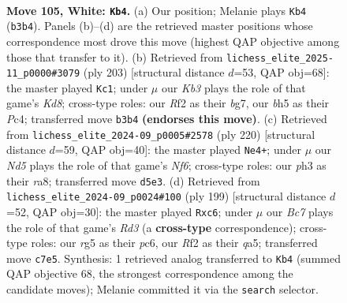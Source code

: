 \documentclass[11pt]{article}
\begin{document}
\clearpage

\begin{figure}[p]\centering
\begin{subfigure}{0.46\textwidth}\centering
\resizebox{\linewidth}{!}{%
\newchessgame
\chessboard[
  setfen={8/2B5/PPk5/3N1Brb/8/1K5p/5R2/8 w - - 9 105},
  showmover=false,
  pgfstyle=straightmove, color=movearrow, markmove={b3-b4}
]}
\caption{}
\end{subfigure}\hfill
\begin{subfigure}{0.46\textwidth}\centering
\resizebox{\linewidth}{!}{%
\newchessgame
\chessboard[
  setfen={8/6B1/pK6/Pb6/2p5/1n6/1R6/3k4 b - - 1 102},
  showmover=false,
  pgfstyle=straightmove, color=movearrow, markmove={d1-c1}
]}
\caption{}
\end{subfigure}
\\[4pt]
\begin{subfigure}{0.46\textwidth}\centering
\resizebox{\linewidth}{!}{%
\newchessgame
\chessboard[
  setfen={r7/3B2k1/4PN2/6K1/8/2B5/2r5/8 w - - 19 111},
  showmover=false,
  pgfstyle=straightmove, color=movearrow, markmove={f6-e4}
]}
\caption{}
\end{subfigure}\hfill
\begin{subfigure}{0.46\textwidth}\centering
\resizebox{\linewidth}{!}{%
\newchessgame
\chessboard[
  setfen={2k5/3b4/2Pr4/Q3Kp2/4p3/6P1/8/8 b - - 2 100},
  showmover=false,
  pgfstyle=straightmove, color=movearrow, markmove={d6-c6}
]}
\caption{}
\end{subfigure}
\caption{\textbf{Move 105, White: \texttt{Kb4}.} (a) Our position; Melanie plays \texttt{Kb4} (\texttt{b3b4}). Panels (b)--(d) are the retrieved master positions whose correspondence most drove this move (highest QAP objective among those that transfer to it). (b) Retrieved from \texttt{lichess\_elite\_2025-11\_p0000\#3079} (ply 203) [structural distance $d$=53, QAP obj=68]: the master played \texttt{Kc1}; under $\mu$ our \emph{Kb3} plays the role of that game's \emph{Kd8}; cross-type roles: our \emph{R}f2 as their \emph{b}g7, our \emph{b}h5 as their \emph{P}c4; transferred move \texttt{b3b4} \textbf{(endorses this move)}. (c) Retrieved from \texttt{lichess\_elite\_2024-09\_p0005\#2578} (ply 220) [structural distance $d$=59, QAP obj=40]: the master played \texttt{Ne4+}; under $\mu$ our \emph{Nd5} plays the role of that game's \emph{Nf6}; cross-type roles: our \emph{p}h3 as their \emph{r}a8; transferred move \texttt{d5e3}. (d) Retrieved from \texttt{lichess\_elite\_2024-09\_p0024\#100} (ply 199) [structural distance $d$=52, QAP obj=30]: the master played \texttt{Rxc6}; under $\mu$ our \emph{Bc7} plays the role of that game's \emph{Rd3} (a \textbf{cross-type} correspondence); cross-type roles: our \emph{r}g5 as their \emph{p}c6, our \emph{R}f2 as their \emph{q}a5; transferred move \texttt{c7e5}. Synthesis: 1 retrieved analog transferred to \texttt{Kb4} (summed QAP objective 68, the strongest correspondence among the candidate moves); Melanie committed it via the \texttt{search} selector.}
\label{fig:thought-m208}
\end{figure}
\end{document}
